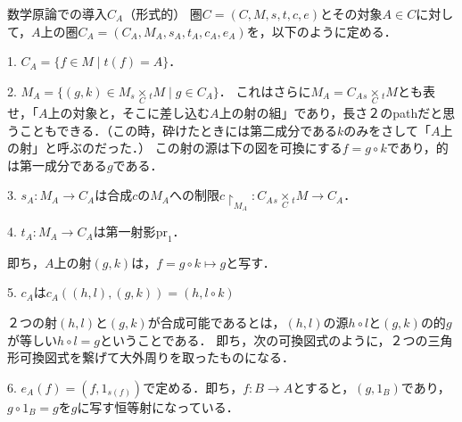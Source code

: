 \documentclass[uplatex, 12pt, dvipdfmx]{jsarticle}
\begin{document}
\begin{itembox}[l]{数学原論での導入$C_A$（形式的）}
    圏$C=(C,M,s,t,c,e)$とその対象$A\in C$に対して，$A$上の圏$C_A=(C_A, M_A, s_A, t_A, c_A, e_A)$を，以下のように定める．

    1. $C_A=\{ f\in M\mid t(f)=A \}$．

    2. $M_A=\{(g,k)\in M_s\underset{C}{\times}{}_tM\mid g\in C_A\}$．
    これはさらに$M_A=C_A{}_s\underset{C}{\times}{}_tM$とも表せ，「$A$上の対象と，そこに差し込む$A$上の射の組」であり，長さ２のpathだと思うこともできる．（この時，砕けたときには第二成分である$k$のみをさして「$A$上の射」と呼ぶのだった．）
    この射の源は下の図を可換にする$f=g\circ k$であり，的は第一成分である$g$である．
    \begin{center}
    \end{center}

    3. $s_A:M_A\to C_A$は合成$c$の$M_A$への制限$c\restriction_{M_A}:C_A{}_s\underset{C}{\times}{}_tM\to C_A$．

    4. $t_A:M_A\to C_A$は第一射影$\mathrm{pr}_1$．

    即ち，$A$上の射$(g,k)$は，$f=g\circ k\mapsto g$と写す．

    5. $c_A$は$c_A((h,l),(g,k))=(h, l\circ k)$
    \begin{center}
    \end{center}
    ２つの射$(h,l)$と$(g,k)$が合成可能であるとは，$(h,l)$の源$h\circ l$と$(g,k)$の的$g$が等しい$h\circ l= g$ということである．
    即ち，次の可換図式のように，２つの三角形可換図式を繋げて大外周りを取ったものになる．
    \begin{center}
    \end{center}

    6. $e_A(f)=(f,1_{s(f)})$で定める．即ち，$f:B\to A$とすると，$(g,1_B)$であり，$g\circ 1_B=g$を$g$に写す恒等射になっている．
    \begin{center}
    \end{center}
\end{itembox}
\end{document}
